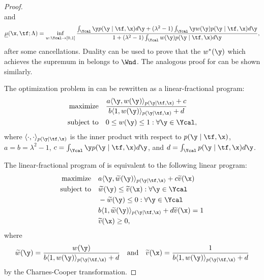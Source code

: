 \begin{lemma}
\begin{proof}
\begin{equation}
        \end{equation}
        and
        \begin{equation}
            \label{eq:lower_capo_app}
            \underline{\mu}(\x, \tf; \Lambda) 
            = \inf_{w: \Ycal \to [0, 1]} \frac{\int_{\Ycal} \y p(\y \mid \tf, \x)d\y + (\lambda^2 - 1)\int_{\Ycal} \y w(\y)p(\y \mid \tf, \x)d\y}{1 + (\lambda^2 - 1)\int_{\Ycal} w(\y)p(\y \mid \tf, \x)d\y},
        \end{equation}
        after some cancellations.
        Duality can be used to prove that the $w^*(\y)$ which achieves the supremum in  belongs to $\Wnd$. 
        The analogous proof for  can be shown similarly.
        
        The optimization problem in  can be rewritten as a linear-fractional program:
        \begin{subequations}
            \label{eq:lfp}
            \begin{align}
                \text{maximize}\quad & \frac{a\langle \y, w(\y) \rangle_{p(\y \mid \tf, \x)} + c}{b\langle 1, w(\y) \rangle_{p(\y \mid \tf, \x)} + d} \\
                \text{subject to}\quad & 0 \leq w(\y) \leq 1: \forall\y \in \Ycal,
            \end{align}
        \end{subequations}
        where $\langle \cdot, \cdot \rangle_{p(\y \mid \tf, \x)}$ is the inner product with respect to $p(\y \mid \tf, \x)$, $a = b = \lambda^2 - 1$, $c = \int_{\Ycal} \y p(\y \mid \tf, \x) d\y$, and $d = \int_{\Ycal} p(\y \mid \tf, \x) d\y$.
        
        The linear-fractional program of  is equivalent to the following linear program:
        \begin{subequations}
            \begin{align}
                \text{maximize}\quad &a\langle \y, \widetilde{w}(\y) \rangle_{p(\y \mid \tf, \x)} + c \widetilde{v}(\x) \\
                \text{subject to}\quad &\widetilde{w}(\y) \leq \widetilde{v}(\x): \forall\y \in \Ycal \label{eq:p_cnstrnt}\\
                &-\widetilde{w}(\y) \leq 0: \forall\y \in \Ycal \label{eq:q_cnstrnt}\\
                & b\langle 1, \widetilde{w}(\y) \rangle_{p(\y \mid \tf, \x)} + d \widetilde{v}(\x) = 1 \label{eq:lambda_cnstrnt}\\
                & \widetilde{v}(\x) \geq 0,
            \end{align}
        \end{subequations}
        where
        \begin{equation*}
            \widetilde{w}(\y) = \frac{w(\y)}{b\langle 1, w(\y) \rangle_{p(\y \mid \tf, \x)} + d} 
            \quad \text{and}
            \quad \widetilde{v}(\x) = \frac{1}{b\langle 1, w(\y) \rangle_{p(\y \mid \tf, \x)} + d}
        \end{equation*}
        by the Charnes-Cooper transformation.
        

\end{proof}
\end{lemma}

